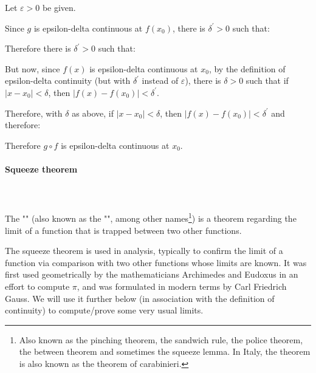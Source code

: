 \begin{enumerate}
	Let $\varepsilon>0$ be given.
	
	Since $g$ is epsilon-delta continuous at $f\left(x_0\right)$, there is $\delta^{\prime}>0$ such that:
	
	Therefore there is $\delta^{\prime}>0$ such that:
	
	But now, since $f(x)$ is epsilon-delta  continuous at $x_0$, by the definition of epsilon-delta continuity (but with $\delta^{\prime}$ instead of $\varepsilon$), there is $\delta>0$ such that if $\left|x-x_0\right|<\delta$, then $\left|f(x)-f\left(x_0\right)\right|<\delta^{\prime}$.

	Therefore, with $\delta$ as above, if $\left|x-x_0\right|<\delta$, then $\left|f(x)-f\left(x_0\right)\right|<\delta^{\prime}$ and therefore:
	
	Therefore $g \circ f$ is epsilon-delta continuous at $x_0$.

	\end{enumerate}

	\paragraph{Squeeze theorem}\label{Squeeze theorem}\mbox{}\\\\
	The "" (also known as the "", among other names\footnote{Also known as the pinching theorem, the sandwich rule, the police theorem, the between theorem and sometimes the squeeze lemma. In Italy, the theorem is also known as the theorem of carabinieri.}) is a theorem regarding the limit of a function that is trapped between two other functions.

	The squeeze theorem is used in analysis, typically to confirm the limit of a function via comparison with two other functions whose limits are known. It was first used geometrically by the mathematicians Archimedes and Eudoxus in an effort to compute $\pi$, and was formulated in modern terms by Carl Friedrich Gauss. We will use it further below (in association with the definition of continuity) to compute/prove some very usual limits.
	
